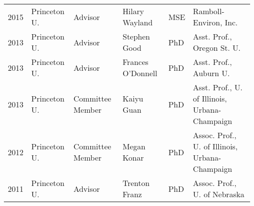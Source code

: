 \documentclass[10pt]{report}
\begin{document}
\begin{longtable}{l | p{1in} | p{0.7in} | p{1.4in} | p{.5in} | p{1.8in} }
2015 & Princeton U. & Advisor & Hilary Wayland & MSE & Ramboll-Environ, Inc. \\ 
2013 & Princeton U. & Advisor & Stephen Good & PhD & Asst. Prof., Oregon St. U. \\
2013 & Princeton U. & Advisor & Frances O'Donnell & PhD & Asst. Prof., Auburn U. \\
2013 & Princeton U. & Committee Member & Kaiyu Guan & PhD & Asst. Prof., U. of Illinois, Urbana-Champaign \\
2012 & Princeton U. & Committee Member & Megan Konar & PhD & Assoc. Prof., U. of Illinois, Urbana-Champaign \\
2011 & Princeton U. & Advisor & Trenton Franz & PhD & Assoc. Prof., U. of Nebraska \\ 
\end{longtable}



\end{document}
